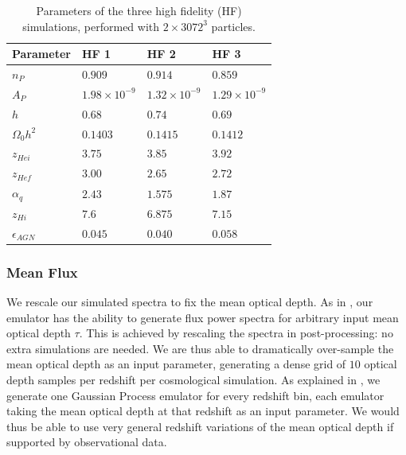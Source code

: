 \documentclass[a4paper,11pt]{article}
\begin{document}
\begin{table}
\begin{centering}
  \begin{tabular}{llll}
  \hline
  Parameter & HF 1 & HF 2 & HF 3\\
    \hline
    $n_P$  &  $0.909$  & $0.914$ & $0.859$ \\
    $A_P$  &  $1.98 \times 10^{-9}$  & $1.32 \times 10^{-9}$ & $1.29 \times 10^{-9}$\\
    $h$    & $0.68$  & $0.74$ & $0.69$\\
    $\Omega_0 h^2$ & $0.1403$ & $0.1415$ & $0.1412$\\
    $z_{Hei}$      & $3.75$  & $3.85$  & $ 3.92$ \\
    $z_{Hef}$      & $3.00$  & $2.65$  & $2.72$\\
    $\alpha_q$     & $2.43$  & $1.575$ & $ 1.87$ \\
    $z_{Hi}$        & $7.6$ & $6.875$   & $7.15 $\\
    $\epsilon_{AGN}$ & $0.045$ & $0.040$ & $ 0.058$\\
    \hline
  \end{tabular}
  \caption{Parameters of the three high fidelity (HF) simulations, performed with $2\times 3072^3$ particles.}
  \label{tab:highfidelity}
  \end{centering}
\end{table}

\subsubsection{Mean Flux}

We rescale our simulated spectra to fix the mean optical depth. As in \cite{Bird:2019}, our emulator has the ability to generate flux power spectra for arbitrary input mean optical depth $\tau$. This is achieved by rescaling the spectra in post-processing: no extra simulations are needed. We are thus able to dramatically over-sample the mean optical depth as an input parameter, generating a dense grid of $10$ optical depth samples per redshift per cosmological simulation. As explained in \cite{Bird:2019}, we generate one Gaussian Process emulator for every redshift bin, each emulator taking the mean optical depth at that redshift as an input parameter. We would thus be able to use very general redshift variations of the mean optical depth if supported by observational data.
\end{document}
